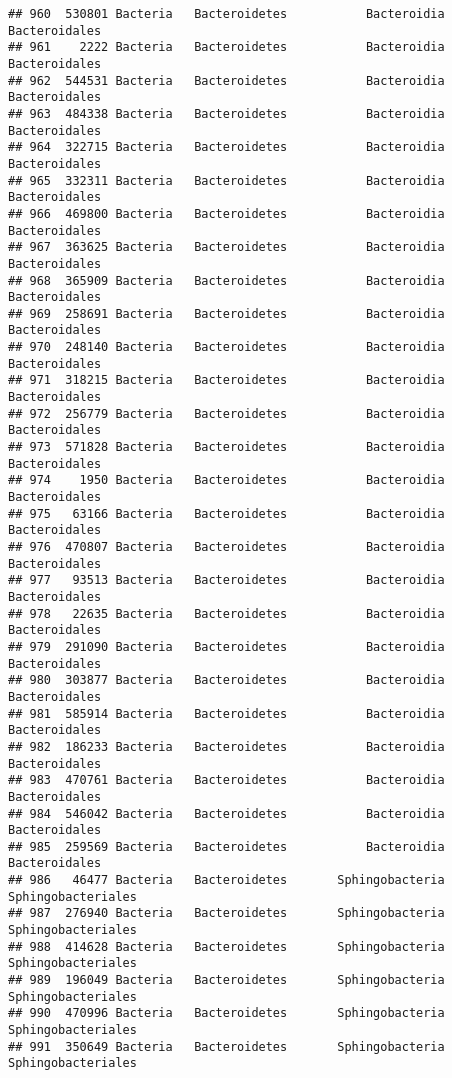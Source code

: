 \documentclass[
]{article}
\begin{document}
\begin{verbatim}
## 960  530801 Bacteria   Bacteroidetes           Bacteroidia       Bacteroidales
## 961    2222 Bacteria   Bacteroidetes           Bacteroidia       Bacteroidales
## 962  544531 Bacteria   Bacteroidetes           Bacteroidia       Bacteroidales
## 963  484338 Bacteria   Bacteroidetes           Bacteroidia       Bacteroidales
## 964  322715 Bacteria   Bacteroidetes           Bacteroidia       Bacteroidales
## 965  332311 Bacteria   Bacteroidetes           Bacteroidia       Bacteroidales
## 966  469800 Bacteria   Bacteroidetes           Bacteroidia       Bacteroidales
## 967  363625 Bacteria   Bacteroidetes           Bacteroidia       Bacteroidales
## 968  365909 Bacteria   Bacteroidetes           Bacteroidia       Bacteroidales
## 969  258691 Bacteria   Bacteroidetes           Bacteroidia       Bacteroidales
## 970  248140 Bacteria   Bacteroidetes           Bacteroidia       Bacteroidales
## 971  318215 Bacteria   Bacteroidetes           Bacteroidia       Bacteroidales
## 972  256779 Bacteria   Bacteroidetes           Bacteroidia       Bacteroidales
## 973  571828 Bacteria   Bacteroidetes           Bacteroidia       Bacteroidales
## 974    1950 Bacteria   Bacteroidetes           Bacteroidia       Bacteroidales
## 975   63166 Bacteria   Bacteroidetes           Bacteroidia       Bacteroidales
## 976  470807 Bacteria   Bacteroidetes           Bacteroidia       Bacteroidales
## 977   93513 Bacteria   Bacteroidetes           Bacteroidia       Bacteroidales
## 978   22635 Bacteria   Bacteroidetes           Bacteroidia       Bacteroidales
## 979  291090 Bacteria   Bacteroidetes           Bacteroidia       Bacteroidales
## 980  303877 Bacteria   Bacteroidetes           Bacteroidia       Bacteroidales
## 981  585914 Bacteria   Bacteroidetes           Bacteroidia       Bacteroidales
## 982  186233 Bacteria   Bacteroidetes           Bacteroidia       Bacteroidales
## 983  470761 Bacteria   Bacteroidetes           Bacteroidia       Bacteroidales
## 984  546042 Bacteria   Bacteroidetes           Bacteroidia       Bacteroidales
## 985  259569 Bacteria   Bacteroidetes           Bacteroidia       Bacteroidales
## 986   46477 Bacteria   Bacteroidetes       Sphingobacteria  Sphingobacteriales
## 987  276940 Bacteria   Bacteroidetes       Sphingobacteria  Sphingobacteriales
## 988  414628 Bacteria   Bacteroidetes       Sphingobacteria  Sphingobacteriales
## 989  196049 Bacteria   Bacteroidetes       Sphingobacteria  Sphingobacteriales
## 990  470996 Bacteria   Bacteroidetes       Sphingobacteria  Sphingobacteriales
## 991  350649 Bacteria   Bacteroidetes       Sphingobacteria  Sphingobacteriales

\end{verbatim}
\end{document}
